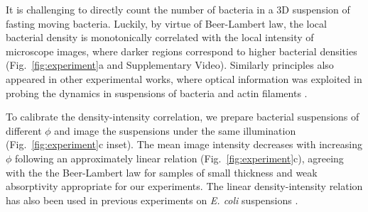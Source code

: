 \documentclass[twocolumn,aps,prx,amsmath,amssymb,longbibliography]{revtex4-2}
\begin{document}
It is challenging to directly count the number of bacteria in a 3D suspension of fasting moving bacteria. Luckily, by virtue of Beer-Lambert law, the local bacterial density is monotonically correlated with the local intensity of microscope images, where darker regions correspond to higher bacterial densities (Fig.~\ref{fig:experiment}a and Supplementary Video). Similarly principles also appeared in other experimental works, where optical information was exploited in probing the dynamics in suspensions of bacteria and actin filaments \cite{Sokolov2009, Wilson2011, Schaller2013}.



To calibrate the density-intensity correlation, we prepare bacterial suspensions of different $\phi$ and image the suspensions under the same illumination (Fig.~\ref{fig:experiment}c inset). The mean image intensity decreases with increasing $\phi$ following an approximately linear relation (Fig.~\ref{fig:experiment}c), agreeing with the the Beer-Lambert law for samples of small thickness and weak absorptivity appropriate for our experiments. The linear density-intensity relation has also been used in previous experiments on \textit{E. coli} suspensions \cite{Wilson2011}.
\end{document}

